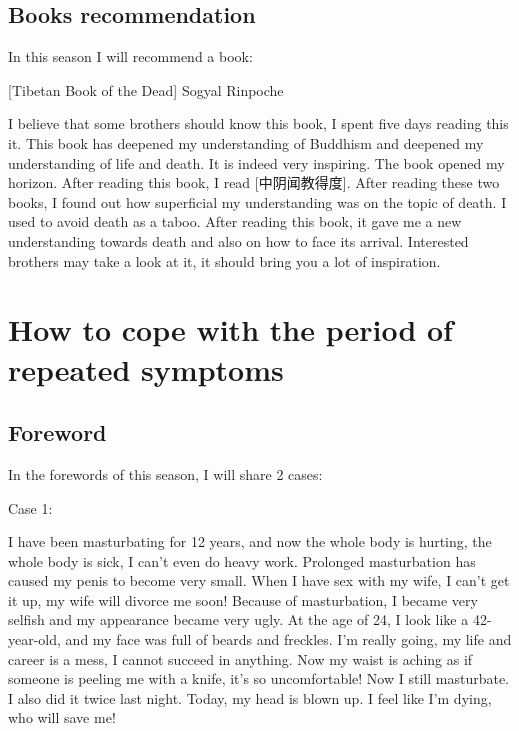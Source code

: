 \documentclass[
]{book}
\begin{document}
\hypertarget{books-recommendation-6}{%
\section{Books recommendation}\label{books-recommendation-6}}

In this season I will recommend a book:

{[}Tibetan Book of the Dead{]} Sogyal Rinpoche

I believe that some brothers should know this book, I spent five days reading this it. This book has deepened my understanding of Buddhism and deepened my understanding of life and death. It is indeed very inspiring. The book opened my horizon. After reading this book, I read {[}中阴闻教得度{]}. After reading these two books, I found out how superficial my understanding was on the topic of death. I used to avoid death as a taboo. After reading this book, it gave me a new understanding towards death and also on how to face its arrival. Interested brothers may take a look at it, it should bring you a lot of inspiration.

\hypertarget{how-to-cope-with-the-period-of-repeated-symptoms}{%
\chapter{How to cope with the period of repeated symptoms}\label{how-to-cope-with-the-period-of-repeated-symptoms}}

\hypertarget{foreword-15}{%
\section{Foreword}\label{foreword-15}}

In the forewords of this season, I will share 2 cases:

Case 1:

I have been masturbating for 12 years, and now the whole body is hurting, the whole body is sick, I can't even do heavy work. Prolonged masturbation has caused my penis to become very small. When I have sex with my wife, I can't get it up, my wife will divorce me soon! Because of masturbation, I became very selfish and my appearance became very ugly. At the age of 24, I look like a 42-year-old, and my face was full of beards and freckles. I'm really going, my life and career is a mess, I cannot succeed in anything. Now my waist is aching as if someone is peeling me with a knife, it's so uncomfortable! Now I still masturbate. I also did it twice last night. Today, my head is blown up. I feel like I'm dying, who will save me!
\end{document}
